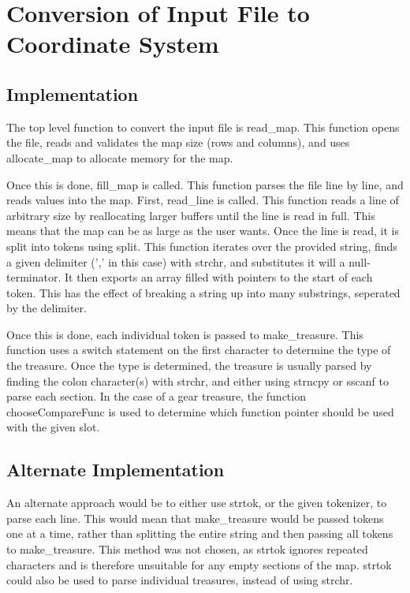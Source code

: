 \documentclass{article}
\begin{document}
\section{Conversion of Input File to Coordinate System}
\subsection{Implementation}
The top level function to convert the input file is read\_map.
This function opens the file, reads and validates the map size (rows and columns),
and uses allocate\_map to allocate memory for the map.

Once this is done, fill\_map is called.
This function parses the file line by line, and reads values into the map.
First, read\_line is called. This function reads a line of arbitrary size
by reallocating larger buffers until the line is read in full. This means that
the map can be as large as the user wants.
Once the line is read, it is split into tokens using split. This function iterates
over the provided string, finds a given delimiter (',' in this case) with strchr, and substitutes
it will a null-terminator. It then exports an array filled with pointers to the start
of each token. This has the effect of breaking a string up into many substrings, seperated
by the delimiter.

Once this is done, each individual token is passed to make\_treasure. This function
uses a switch statement on the first character to determine the type of the treasure.
Once the type is determined, the treasure is usually parsed by finding the colon character(s)
with strchr, and either using strncpy or sscanf to parse each section.
In the case of a gear treasure,
the function chooseCompareFunc is used to determine which function pointer should be used
with the given slot.

\subsection{Alternate Implementation}

An alternate approach would be to either use strtok, or the given tokenizer, to parse each line.
This would mean that make\_treasure would be passed tokens one at a time, rather than splitting the entire
string and then passing all tokens to make\_treasure. This method was not chosen, as strtok ignores repeated
characters and is therefore unsuitable for any empty sections of the map. strtok could also be used to parse
individual treasures, instead of using strchr.
\end{document}
